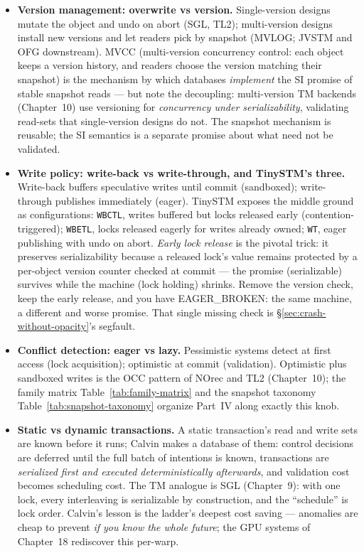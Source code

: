 \begin{itemize}
\item \textbf{Version management: overwrite vs version.} Single-version
designs mutate the object and undo on abort (SGL, TL2); multi-version designs
install new versions and let readers pick by snapshot (MVLOG; JVSTM and OFG
downstream). MVCC (multi-version concurrency control: each object keeps a
version history, and readers choose the version matching their snapshot) is
the mechanism by which databases \emph{implement} the SI
promise of stable snapshot reads --- but note the decoupling: multi-version
TM backends (Chapter~10) use versioning for \emph{concurrency under
serializability}, validating read-sets that single-version designs do not.
The snapshot mechanism is reusable; the SI semantics is a separate promise
about what need not be validated.

\item \textbf{Write policy: write-back vs write-through, and TinySTM's three.}
Write-back buffers speculative writes until commit (sandboxed);
write-through publishes immediately (eager). TinySTM \cite{felber08tinystm}
exposes the middle ground as configurations: \texttt{WBCTL}, writes buffered
but locks released early (contention-triggered); \texttt{WBETL}, locks
released eagerly for writes already owned; \texttt{WT}, eager publishing with
undo on abort. \emph{Early lock release} is the pivotal trick: it preserves
serializability because a released lock's value remains protected by a
per-object version counter checked at commit --- the promise (serializable)
survives while the machine (lock holding) shrinks. Remove the version check,
keep the early release, and you have EAGER\_BROKEN: the same machine, a
different and worse promise. That single missing check is
\S\ref{sec:crash-without-opacity}'s segfault.

\item \textbf{Conflict detection: eager vs lazy.} Pessimistic systems detect
at first access (lock acquisition); optimistic at commit (validation).
Optimistic plus sandboxed writes is the OCC pattern of NOrec and TL2
(Chapter~10); the family matrix Table~\ref{tab:family-matrix} and the snapshot
taxonomy Table~\ref{tab:snapshot-taxonomy} organize Part~IV along exactly
this knob.

\item \textbf{Static vs dynamic transactions.} A static transaction's read
and write sets are known before it runs; Calvin \cite{thomson12calvin} makes
a database of them: control decisions are deferred until the full batch of
intentions is known, transactions are \emph{serialized first and executed
deterministically afterwards}, and validation cost becomes scheduling cost.
The TM analogue is SGL (Chapter~9): with one lock, every interleaving is
serializable by construction, and the ``schedule'' is lock order. Calvin's
lesson is the ladder's deepest cost saving --- anomalies are cheap to prevent
\emph{if you know the whole future}; the GPU systems of Chapter~18
rediscover this per-warp.


\end{itemize}
